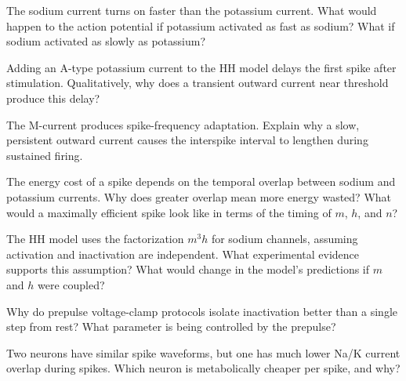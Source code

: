 \begin{conceptquestions}
  \item The sodium current turns on faster than the potassium current. What would happen to the action potential if potassium activated as fast as sodium? What if sodium activated as slowly as potassium?

  \item Adding an A-type potassium current to the HH model delays the first spike after stimulation. Qualitatively, why does a transient outward current near threshold produce this delay?

  \item The M-current produces spike-frequency adaptation. Explain why a slow, persistent outward current causes the interspike interval to lengthen during sustained firing.

  \item The energy cost of a spike depends on the temporal overlap between sodium and potassium currents. Why does greater overlap mean more energy wasted? What would a maximally efficient spike look like in terms of the timing of $m$, $h$, and $n$?

  \item The HH model uses the factorization $m^3 h$ for sodium channels, assuming activation and inactivation are independent. What experimental evidence supports this assumption? What would change in the model's predictions if $m$ and $h$ were coupled?

  \item Why do prepulse voltage-clamp protocols isolate inactivation better than a single step from rest? What parameter is being controlled by the prepulse?

  \item Two neurons have similar spike waveforms, but one has much lower Na/K current overlap during spikes. Which neuron is metabolically cheaper per spike, and why?
\end{conceptquestions}
